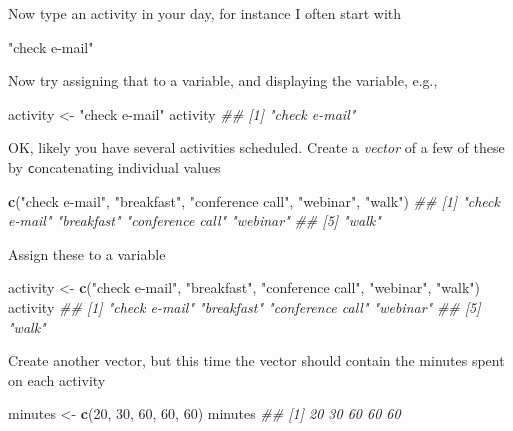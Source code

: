 \documentclass[
]{book}
\newenvironment{Shaded}{\begin{snugshade}}{\end{snugshade}}
\newcommand{\CommentTok}[1]{\textcolor[rgb]{0.56,0.35,0.01}{\textit{#1}}}
\newcommand{\DecValTok}[1]{\textcolor[rgb]{0.00,0.00,0.81}{#1}}
\newcommand{\KeywordTok}[1]{\textcolor[rgb]{0.13,0.29,0.53}{\textbf{#1}}}
\newcommand{\NormalTok}[1]{#1}
\newcommand{\StringTok}[1]{\textcolor[rgb]{0.31,0.60,0.02}{#1}}
\begin{document}
Now type an activity in your day, for instance I often start with

\begin{Shaded}
\begin{Highlighting}[]
\StringTok{"check e-mail"}
\end{Highlighting}
\end{Shaded}

Now try assigning that to a variable, and displaying the variable, e.g.,

\begin{Shaded}
\begin{Highlighting}[]
\NormalTok{activity <-}\StringTok{ "check e-mail"}
\NormalTok{activity}
\CommentTok{## [1] "check e-mail"}
\end{Highlighting}
\end{Shaded}

OK, likely you have several activities scheduled. Create a \emph{vector} of a few of
these by \texttt{c}oncatenating individual values

\begin{Shaded}
\begin{Highlighting}[]
\KeywordTok{c}\NormalTok{(}\StringTok{"check e-mail"}\NormalTok{, }\StringTok{"breakfast"}\NormalTok{, }\StringTok{"conference call"}\NormalTok{, }\StringTok{"webinar"}\NormalTok{, }\StringTok{"walk"}\NormalTok{)}
\CommentTok{## [1] "check e-mail"    "breakfast"       "conference call" "webinar"        }
\CommentTok{## [5] "walk"}
\end{Highlighting}
\end{Shaded}

Assign these to a variable

\begin{Shaded}
\begin{Highlighting}[]
\NormalTok{activity <-}\StringTok{ }\KeywordTok{c}\NormalTok{(}\StringTok{"check e-mail"}\NormalTok{, }\StringTok{"breakfast"}\NormalTok{, }\StringTok{"conference call"}\NormalTok{, }\StringTok{"webinar"}\NormalTok{, }\StringTok{"walk"}\NormalTok{)}
\NormalTok{activity}
\CommentTok{## [1] "check e-mail"    "breakfast"       "conference call" "webinar"        }
\CommentTok{## [5] "walk"}
\end{Highlighting}
\end{Shaded}

Create another vector, but this time the vector should contain the minutes spent on each activity

\begin{Shaded}
\begin{Highlighting}[]
\NormalTok{minutes <-}\StringTok{ }\KeywordTok{c}\NormalTok{(}\DecValTok{20}\NormalTok{, }\DecValTok{30}\NormalTok{, }\DecValTok{60}\NormalTok{, }\DecValTok{60}\NormalTok{, }\DecValTok{60}\NormalTok{)}
\NormalTok{minutes}
\CommentTok{## [1] 20 30 60 60 60}
\end{Highlighting}
\end{Shaded}
\end{document}
